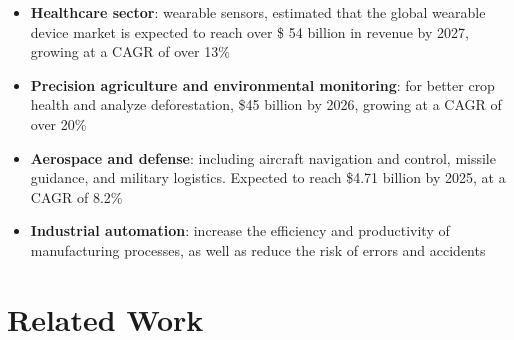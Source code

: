 \documentclass[rnd]{mas_proposal}
\begin{document}
\begin{itemize}
    \item \textbf{Healthcare sector}: wearable sensors, estimated that the global wearable device market is expected to reach over \$ 54 billion in revenue by 2027, growing at a CAGR of over 13\%
    
    \item \textbf{Precision agriculture and  environmental monitoring}: for better crop health and analyze deforestation, \$45 billion by 2026, growing at a CAGR of over 20\% 
    
    \item \textbf{Aerospace and defense}: including aircraft navigation and control, missile guidance, and military logistics. Expected to reach \$4.71 billion by 2025, at a CAGR of 8.2\%    

    \item \textbf{Industrial automation}:  increase the efficiency and productivity of manufacturing processes, as well as reduce the risk of errors and accidents
    

    
 \end{itemize}

\section{Related Work}
\end{document}
